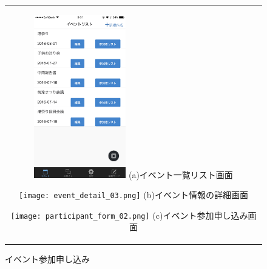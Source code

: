 \begin{figure}[htbp]
  \begin{center}
    \begin{tabular}{c}

      \begin{minipage}{0.33\hsize}
        \begin{center}
\includegraphics[width=4cm]{event_list.png}
          \hspace{1cm} %
          {\footnotesize (a)イベント一覧リスト画面}
        \end{center}
      \end{minipage}

      \begin{minipage}{0.33\hsize}
        \begin{center}
\texttt{[image: event\_detail\_03.png]}
          \hspace{1cm}%
          {\footnotesize (b)イベント情報の詳細画面}
        \end{center}
      \end{minipage}

      \begin{minipage}{0.33\hsize}
        \begin{center}
\texttt{[image: participant\_form\_02.png]}
          \hspace{1cm}%
          {\footnotesize (c)イベント参加申し込み画面}
        \end{center}
      \end{minipage}

    \end{tabular}
    \caption{イベント参加申し込み}
    \label{tab:event_apply}
  \end{center}
\end{figure}

